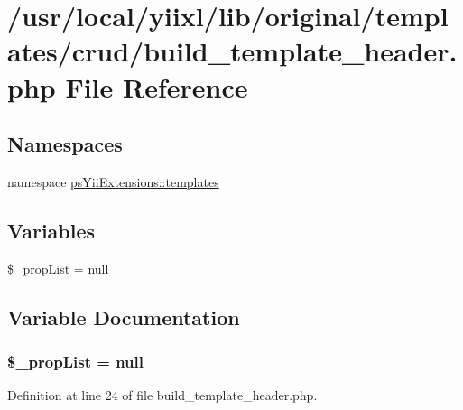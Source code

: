 \hypertarget{build__template__header_8php}{
\section{/usr/local/yiixl/lib/original/templates/crud/build\_\-template\_\-header.php File Reference}
\label{build__template__header_8php}
}
\subsection*{Namespaces}
\begin{DoxyCompactItemize}
\item 
namespace \hyperlink{namespacepsYiiExtensions_1_1templates}{psYiiExtensions::templates}
\end{DoxyCompactItemize}
\subsection*{Variables}
\begin{DoxyCompactItemize}
\item 
\hyperlink{build__template__header_8php_a214f020fad8e2be8402a834f4645e481}{\$\_\-propList} = null
\end{DoxyCompactItemize}


\subsection{Variable Documentation}
\hypertarget{build__template__header_8php_a214f020fad8e2be8402a834f4645e481}{
\subsubsection[{\$\_\-propList}]{\setlength{\rightskip}{0pt plus 5cm}\$\_\-propList = null}}
\label{build__template__header_8php_a214f020fad8e2be8402a834f4645e481}


Definition at line 24 of file build\_\-template\_\-header.php.

